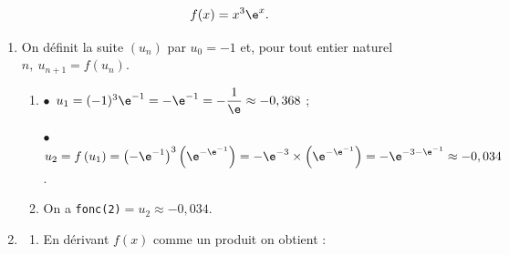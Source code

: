 
\medskip

%


\[f(x) = x^3\e^x.\]


\medskip

\begin{enumerate}
\item On définit la suite $\left(u_n\right)$ par $u_0 = - 1$ et, pour tout entier naturel $n,\: u_{n+1} = f\left(u_n\right)$.
	\begin{enumerate}
		\item %
$\bullet~~$$u_1 = (- 1)^3 \e^{-1} = - \e^{-1} = - \dfrac{1}{\e} \approx - 0,368 $ ;

$\bullet~~$$u_2 = f\left(u_1\right) = \left(- \e^{-1}\right)^3\left(\e^{-\e^{-1}}\right) = - \e^{-3} \times \left(\e^{-\e^{-1}}\right) = - \e^{- 3 - \e^{-1}} \approx - 0,034$.
		
		\item %

\smallskip

%
%
%
On a \texttt{fonc(2)}$ = u_2 \approx - 0,034$.
	\end{enumerate}
\item 
	\begin{enumerate}
		\item %
En dérivant $f(x)$ comme un produit on obtient :
		

\end{enumerate}
\end{enumerate}
